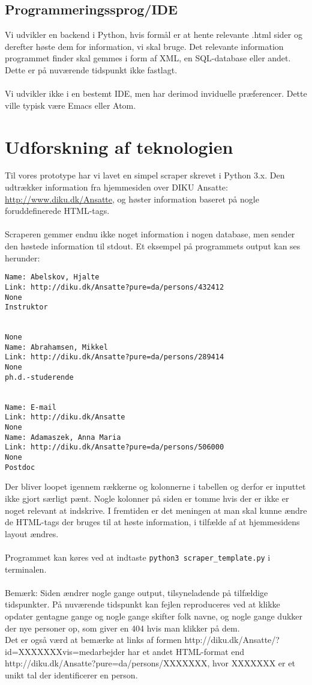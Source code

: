 \documentclass[11pt]{article}
\begin{document}
\subsection{Programmeringssprog/IDE}
Vi udvikler en backend i Python, hvis formål er at hente relevante .html sider og derefter høste dem for information, vi skal bruge. Det relevante information programmet finder skal gemmes i form af XML, en SQL-database eller andet. Dette er på nuværende tidspunkt ikke fastlagt.\\
\\
Vi udvikler ikke i en bestemt IDE, men har derimod inviduelle præferencer. Dette ville typisk være Emacs eller Atom.

\section{Udforskning af teknologien}

Til vores prototype har vi lavet en simpel scraper skrevet i Python 3.x. Den udtrækker information fra hjemmesiden over DIKU Ansatte: \url{http://www.diku.dk/Ansatte}, og høster information baseret på nogle foruddefinerede HTML-tags.\\
\\
Scraperen gemmer endnu ikke noget information i nogen database, men sender den høstede information til stdout. Et eksempel på programmets output kan ses herunder:
\begin{lstlisting}
Name: Abelskov, Hjalte
Link: http://diku.dk/Ansatte?pure=da/persons/432412
None
Instruktor


None
Name: Abrahamsen, Mikkel
Link: http://diku.dk/Ansatte?pure=da/persons/289414
None
ph.d.-studerende


Name: E-mail
Link: http://diku.dk/Ansatte
None
Name: Adamaszek, Anna Maria
Link: http://diku.dk/Ansatte?pure=da/persons/506000
None
Postdoc
\end{lstlisting}
Der bliver loopet igennem rækkerne og kolonnerne i tabellen og derfor er inputtet ikke gjort særligt pænt. Nogle kolonner på siden er tomme hvis der er ikke er noget relevant at indskrive. I fremtiden er det meningen at man skal kunne ændre de HTML-tags der bruges til at høste information, i tilfælde af at hjemmesidens layout ændres.\\
\\
Programmet kan køres ved at indtaste \texttt{python3 scraper\_template.py} i terminalen.\\
\\
Bemærk: Siden ændrer nogle gange output, tilsyneladende på tilfældige tidspunkter. På nuværende tidspunkt kan fejlen reproduceres ved at klikke opdater gentagne gange og nogle gange skifter folk navne, og nogle gange dukker der nye personer op, som giver en 404 hvis man klikker på dem.\\
Det er også værd at bemærke at links af formen http://diku.dk/Ansatte/?id=XXXXXXXvis=medarbejder har et andet HTML-format end http://diku.dk/Ansatte?pure=da/persons/XXXXXXX, hvor XXXXXXX er et unikt tal der identificerer en person.\\
\end{document}
